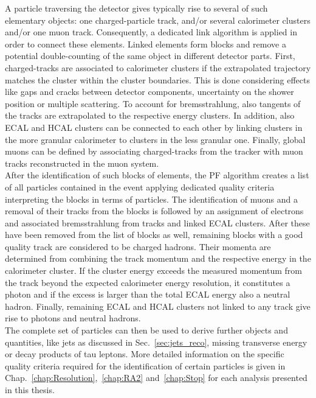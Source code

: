 A particle traversing the detector gives typically rise to several of such elementary objects: one charged-particle track, and/or several calorimeter clusters and/or one muon track. Consequently, a dedicated link algorithm is applied in order to connect these elements. Linked elements form blocks and remove a potential double-counting of the same object in different detector parts. First, charged-tracks are associated to calorimeter clusters if the extrapolated trajectory matches the cluster within the cluster boundaries. This is done considering effects like gaps and cracks between detector components, uncertainty on the shower position or multiple scattering. To account for bremsstrahlung, also tangents of the tracks are extrapolated to the respective energy clusters. In addition, also ECAL and HCAL clusters can be connected to each other by linking clusters in the more granular calorimeter to clusters in the less granular one. Finally, global muons can be defined by associating charged-tracks from the tracker with muon tracks reconstructed in the muon system. \\
After the identification of such blocks of elements, the PF algorithm creates a list of all particles contained in the event applying dedicated quality criteria interpreting the blocks in terms of particles. The identification of muons and a removal of their tracks from the blocks is followed by an assignment of electrons and associated bremsstrahlung from tracks and linked ECAL clusters. After these have been removed from the list of blocks as well, remaining blocks with a good quality track are considered to be charged hadrons. Their momenta are determined from combining the track momentum and the respective energy in the calorimeter cluster. If the cluster energy exceeds the measured momentum from the track beyond the expected calorimeter energy resolution, it constitutes a photon and if the excess is larger than the total ECAL energy also a neutral hadron. Finally, remaining ECAL and HCAL clusters not linked to any track give rise to photons and neutral hadrons. \\
The complete set of particles can then be used to derive further objects and quantities, like jets as discussed in Sec.~\ref{sec:jets_reco}, missing transverse energy \met or decay products of tau leptons. More detailed information on the specific quality criteria required for the identification of certain particles is given in Chap.~\ref{chap:Resolution},~\ref{chap:RA2} and~\ref{chap:Stop} for each analysis presented in this thesis.


